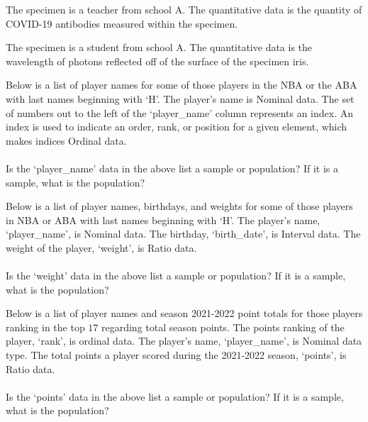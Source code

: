 \begin{example}
The specimen is a teacher from school A. The quantitative data is the quantity of COVID-19 antibodies measured within the specimen. 
\end{example}

\begin{example}
The specimen is a student from school A. The quantitative data is the wavelength of photons reflected off of the surface of the specimen iris. 
\end{example}

\begin{dataset}
Below is a list of player names for some of those players in the NBA or the ABA with last names beginning with `H'. The player's name is Nominal data. The set of numbers out to the left of the `player\_name' column represents an index. An index is used to indicate an order, rank, or position for a given element, which makes indices Ordinal data. \\[1ex]
\\[2ex]
Is the `player\_name' data in the above list a sample or population? If it is a sample, what is the population?
\end{dataset}

\begin{dataset}
Below is a list of player names, birthdays, and weights for some of those players in NBA or ABA with last names beginning with `H'. The player's name, `player\_name', is Nominal data. The birthday, `birth\_date', is Interval data. The weight of the player, `weight', is Ratio data.\\[1ex]
\\[2ex]
Is the `weight' data in the above list a sample or population? If it is a sample, what is the population?
\end{dataset}

\begin{dataset}
Below is a list of player names and season 2021-2022 point totals for those players ranking in the top $17$ regarding total season points. The points ranking of the player, `rank', is ordinal data. The player's name, `player\_name', is Nominal data type. The total points a player scored during the 2021-2022 season, `points', is Ratio data.\\[1ex]
\\[2ex]
Is the `points' data in the above list a sample or population? If it is a sample, what is the population?
\end{dataset}